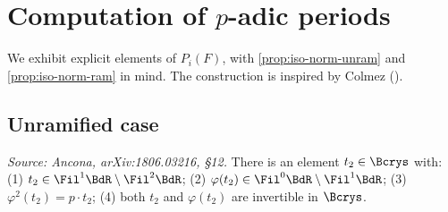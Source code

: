 \section{Computation of $p$-adic periods}
\label{sec:padic-computation}

We exhibit explicit elements of \(P_i(F)\), with
\cref{prop:iso-norm-unram} and \cref{prop:iso-norm-ram} in mind. The
construction is inspired by Colmez (\cite[\S9]{Colmez}).

\subsection*{Unramified case}

\begin{proposition}
  \label{prop:lubin-tate-unram}
  \textit{Source: Ancona, arXiv:1806.03216, \S12.}
  There is an element \(t_2 \in \Bcrys\) with:
  (1) \(t_2 \in \Fil^1 \BdR \setminus \Fil^2 \BdR\);
  (2) \(\varphi(t_2) \in \Fil^0 \BdR \setminus \Fil^1 \BdR\);
  (3) \(\varphi^2(t_2) = p \cdot t_2\);
  (4) both \(t_2\) and \(\varphi(t_2)\) are invertible in \(\Bcrys\).
\end{proposition}


